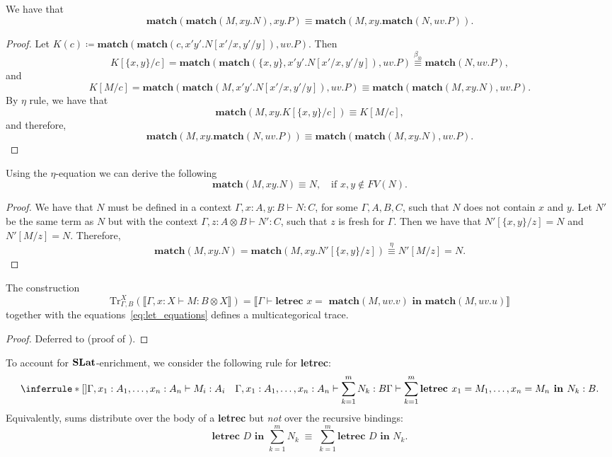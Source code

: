 \begin{lemma}\label{lemma:match-comm}
  We have that
  \[
 \textbf{match}(\textbf{match}(M, xy.N), xy.P) \equiv \textbf{match}(M, xy.\textbf{match}(N, uv.P)).
  \]
\end{lemma}
\begin{proof}
Let $K(c) \coloneqq \textbf{match}(\textbf{match}(c, x'y'.N[x'/x, y'/y]), uv.P)$.
Then
\[
K[\{x,y\}/c] = \textbf{match}(\textbf{match}(\{x,y\}, x'y'.N[x'/x,y'/y]), uv.P) \stackrel{\beta_\otimes}{\equiv} \textbf{match}(N, uv.P),
\]
and
\[
K[M/c] = \textbf{match}(\textbf{match}(M, x'y'.N[x'/x,y'/y]), uv.P) \equiv \textbf{match}(\textbf{match}(M, xy.N), uv.P).
\]
By $\eta$ rule, we have that
\[
\textbf{match}(M, xy.K[\{x,y\}/c]) \equiv K[M/c],
\]
and therefore,
\[
\textbf{match}(M, xy.\textbf{match}(N, uv.P)) \equiv \textbf{match}(\textbf{match}(M, xy.N), uv.P).
\]
\end{proof}
\begin{lemma}\label{lemma:match-gc}
Using the $\eta$-equation we can derive the following
\[
\textbf{match}(M, xy.N) \equiv N, \quad \text{if } x,y \not \in FV(N).
\]
\end{lemma}
\begin{proof}
We have that $N$ must be defined in a context $\Gamma, x : A, y : B \vdash N : C$, for some $\Gamma, A, B, C$, such that $N$ does not contain $x$ and $y$.
Let $N'$ be the same term as $N$ but with the context $\Gamma, z : A \otimes B \vdash N' : C$, such that $z$ is fresh for $\Gamma$.
Then we have that $N'[\{x,y\}/z] = N$ and $N'[M/z] = N$.
Therefore,
\[
\textbf{match}(M, xy.N) = \textbf{match}(M, xy.N'[\{x,y\}/z]) \stackrel{\eta}{\equiv} N'[M/z] = N.
\]
\end{proof}

\begin{proposition}
The construction
\[
\text{Tr}_{\Gamma,B}^{X}(\llbracket \Gamma, x : X \vdash M : B \otimes X \rrbracket) = \llbracket \Gamma \vdash \textbf{letrec } x = \textbf{ match}(M, uv.v) \textbf{ in } \textbf{match}(M, uv.u)\rrbracket
\]
together with the equations~\autoref{eq:let_equations} defines a multicategorical trace.
\end{proposition}
\begin{proof}
  Deferred to  (proof of ).
\end{proof}

To account for $\mathbf{SLat}$-enrichment, we consider the following rule for \textbf{letrec}:
\[
\inferrule*[]{\Gamma, x_1 : A_1, \ldots, x_n : A_n \vdash M_i : A_i \quad \Gamma, x_1 : A_1, \ldots, x_n : A_n \vdash \sum_{k=1}^{m}N_{k} : B}
{\Gamma \vdash \sum_{k=1}^{m}\textbf{letrec } x_1 = M_1, \ldots, x_n = M_n \textbf{ in } N_k : B}.
\]
Equivalently, sums distribute over the body of a \textbf{letrec} but \emph{not} over the recursive bindings:
\[
\textbf{letrec } D \textbf{ in } \sum_{k=1}^{m} N_k \;\equiv\; \sum_{k=1}^{m} \textbf{letrec } D \textbf{ in } N_k.
\]

